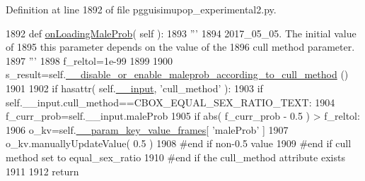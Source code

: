 Definition at line 1892 of file pgguisimupop\+\_\+experimental2.\+py.


\begin{DoxyCode}
1892     \textcolor{keyword}{def }\hyperlink{classnegui_1_1pgguisimupop__experimental2_1_1PGGuiSimuPop_a19bd49cf3fa3b2e37660992fff97daee}{onLoadingMaleProb}( self ):
1893         \textcolor{stringliteral}{'''}
1894 \textcolor{stringliteral}{        2017\_05\_05.  The initial value of}
1895 \textcolor{stringliteral}{        this parameter depends on the value of the}
1896 \textcolor{stringliteral}{        cull method parameter. }
1897 \textcolor{stringliteral}{        '''}
1898         f\_reltol=1e-99
1899         
1900         s\_result=self.\hyperlink{classnegui_1_1pgguisimupop__experimental2_1_1PGGuiSimuPop_acfca30cb65c4fd8b6e2db1f4f7f0a729}{\_\_disable\_or\_enable\_maleprob\_according\_to\_cull\_method}
      ()
1901         
1902         \textcolor{keywordflow}{if} hasattr( self.\hyperlink{classnegui_1_1pgguisimupop__experimental2_1_1PGGuiSimuPop_a69deac7dfed31f2ba496671465ee4d1c}{\_\_input}, \textcolor{stringliteral}{'cull\_method'} ):
1903             \textcolor{keywordflow}{if} self.\_\_input.cull\_method==CBOX\_EQUAL\_SEX\_RATIO\_TEXT:
1904                 f\_curr\_prob=self.\_\_input.maleProb
1905                 \textcolor{keywordflow}{if} abs( f\_curr\_prob - 0.5 ) > f\_reltol:
1906                     o\_kv=self.\hyperlink{classnegui_1_1pgguisimupop__experimental2_1_1PGGuiSimuPop_a08bb009e9a24284adfbd8a38dcc0c861}{\_\_param\_key\_value\_frames}[ \textcolor{stringliteral}{'maleProb'} ]
1907                     o\_kv.manuallyUpdateValue( 0.5 )
1908                 \textcolor{comment}{#end if non-0.5 value}
1909             \textcolor{comment}{#end if cull method set to equal\_sex\_ratio  }
1910         \textcolor{comment}{#end if the cull\_method attribute exists}
1911 
1912         \textcolor{keywordflow}{return}
\end{DoxyCode}
